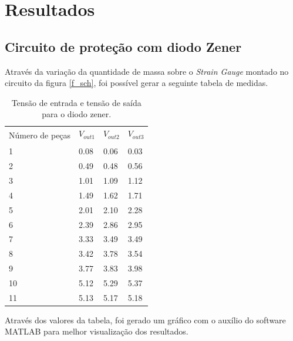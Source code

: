 \newpage
\section{Resultados}

\subsection{Circuito de proteção com diodo Zener}

Através da variação da quantidade de massa sobre o \textit{Strain Gauge} montado no circuito da figura \ref{f_sch}, foi possível gerar a seguinte tabela de medidas.

\begin{small}
    \begin{table}[H]
        \begin{center}
            \caption{Tensão de entrada e tensão de saída para o diodo zener.}
            \begin{tabular}{l|l|l|l}
                \hline
                \multirow{2}{50pt}{Número de peças } & $V_{out1}$ & $V_{out2}$ & $V_{out3}$ \\
                & & & \\
                \hline
                1 & 0.08 & 0.06 & 0.03 \\
                2 & 0.49 & 0.48 & 0.56 \\
                3 & 1.01 & 1.09 & 1.12 \\
                4 & 1.49 & 1.62 & 1.71 \\
                5 & 2.01 & 2.10 & 2.28 \\
                6 & 2.39 & 2.86 & 2.95 \\
                7 & 3.33 & 3.49 & 3.49 \\
                8 & 3.42 & 3.78 & 3.54 \\
                9 & 3.77 & 3.83 & 3.98 \\
                10 & 5.12 & 5.29 & 5.37 \\
                11 & 5.13 & 5.17 & 5.18 \\ 
                \hline
            \end{tabular}
            \label{t_zener}
        \end{center}
    \end{table}
\end{small}

Através dos valores da tabela, foi gerado um gráfico com o auxílio do software MATLAB para melhor visualização dos resultados.

